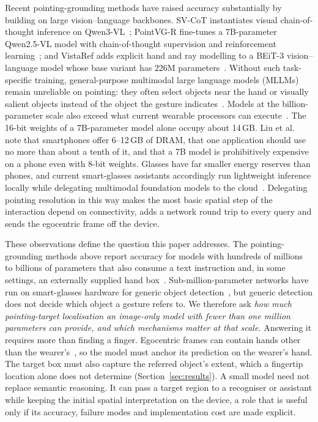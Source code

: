 Recent pointing-grounding methods have raised accuracy substantially by building on large vision--language backbones. SV-CoT instantiates visual chain-of-thought inference on Qwen3-VL~\cite{egopoint}; PointVG-R fine-tunes a 7B-parameter Qwen2.5-VL model with chain-of-thought supervision and reinforcement learning~\cite{li2026pointvgr}; and VistaRef adds explicit hand and ray modelling to a BEiT-3 vision--language model whose base variant has 226M parameters~\cite{li2026vistaref}. Without such task-specific training, general-purpose multimodal large language models (MLLMs) remain unreliable on pointing: they often select objects near the hand or visually salient objects instead of the object the gesture indicates~\cite{li2026egopointbench,choi2026hint}. Models at the billion-parameter scale also exceed what current wearable processors can execute~\cite{yuan2026aiglasses}. The 16-bit weights of a 7B-parameter model alone occupy about 14\,GB. Liu et al.~\cite{liu2024mobilellm} note that smartphones offer 6--12\,GB of DRAM, that one application should use no more than about a tenth of it, and that a 7B model is prohibitively expensive on a phone even with 8-bit weights. Glasses have far smaller energy reserves than phones, and current smart-glasses assistants accordingly run lightweight inference locally while delegating multimodal foundation models to the cloud~\cite{yuan2026aiglasses}. Delegating pointing resolution in this way makes the most basic spatial step of the interaction depend on connectivity, adds a network round trip to every query and sends the egocentric frame off the device.

These observations define the question this paper addresses. The pointing-grounding methods above report accuracy for models with hundreds of millions to billions of parameters that also consume a text instruction and, in some settings, an externally supplied hand box~\cite{egopoint}. Sub-million-parameter networks have run on smart-glasses hardware for generic object detection~\cite{moosmann2024tinyissimoyolo}, but generic detection does not decide which object a gesture refers to. We therefore ask \emph{how much pointing-target localisation an image-only model with fewer than one million parameters can provide, and which mechanisms matter at that scale.} Answering it requires more than finding a finger. Egocentric frames can contain hands other than the wearer's~\cite{bambach2015lending}, so the model must anchor its prediction on the wearer's hand. The target box must also capture the referred object's extent, which a fingertip location alone does not determine (Section~\ref{sec:results}). A small model need not replace semantic reasoning. It can pass a target region to a recogniser or assistant while keeping the initial spatial interpretation on the device, a role that is useful only if its accuracy, failure modes and implementation cost are made explicit.

